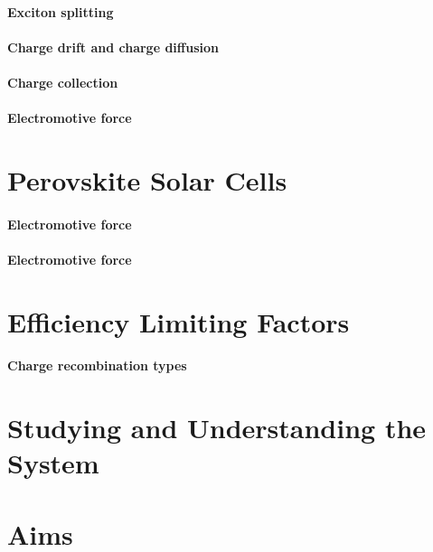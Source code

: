  \paragraph{Exciton splitting} 
 
 \paragraph{Charge drift and charge diffusion} 
 
 \paragraph{Charge collection} 
 
 \paragraph{Electromotive force} 

\section{Perovskite Solar Cells}

 \paragraph{Electromotive force} 

 \paragraph{Electromotive force} 

\section{Efficiency Limiting Factors}

 \paragraph{Charge recombination types} 

\section{Studying and Understanding the System}

\section{Aims}